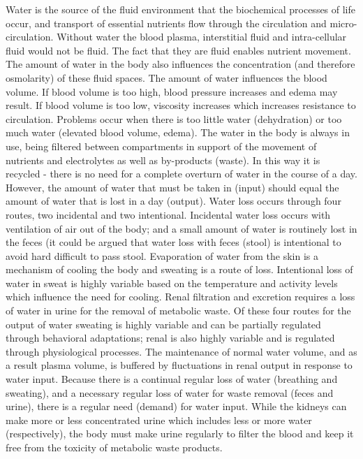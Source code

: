 Water is the source of the fluid environment that the biochemical processes of life occur, and transport of essential nutrients flow through the circulation and micro-circulation. Without water the blood plasma, interstitial fluid and intra-cellular fluid would not be fluid. The fact that they are fluid enables nutrient movement. The amount of water in the body also influences the concentration (and therefore osmolarity) of these fluid spaces. The amount of water influences the blood volume. If blood volume is too high, blood pressure increases and edema may result. If blood volume is too low, viscosity increases which increases resistance to circulation. Problems occur when there is too little water (dehydration) or too much water (elevated blood volume, edema). The water in the body is always in use, being filtered between compartments in support of the movement of nutrients and electrolytes as well as by-products (waste). In this way it is recycled - there is no need for a complete overturn of water in the course of a day. However, the amount of water that must be taken in (input) should equal the amount of water that is lost in a day (output). Water loss occurs through four routes, two incidental and two intentional. Incidental water loss occurs with ventilation of air out of the body; and a small amount of water is routinely lost in the feces (it could be argued that water loss with feces (stool) is intentional to avoid hard difficult to pass stool. Evaporation of water from the skin is a mechanism of cooling the body and sweating is a route of loss. Intentional loss of water in sweat is highly variable based on the temperature and activity levels which influence the need for cooling. Renal filtration and excretion requires a loss of water in urine for the removal of metabolic waste. Of these four routes for the output of water sweating is highly variable and can be partially regulated through behavioral adaptations; renal is also highly variable and is regulated through physiological processes. The maintenance of normal water volume, and as a result plasma volume, is buffered by fluctuations in renal output in response to water input. Because there is a continual regular loss of water (breathing and sweating), and a necessary regular loss of water for waste removal (feces and urine), there is a regular need (demand) for water input. While the kidneys can make more or less concentrated urine which includes less or more water (respectively), the body must make urine regularly to filter the blood and keep it free from the toxicity of metabolic waste products.

